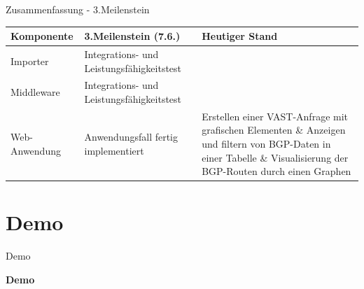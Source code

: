 \documentclass[9pt]{beamer}
\begin{document}
\begin{frame}{Zusammenfassung - 3.Meilenstein}
	\begin{table}[h!]
	\centering
	\begin{tabular}{p{5em} p{12em} p{14em}}
		\textbf{Komponente} & \textbf{3.Meilenstein (7.6.)} & \textbf{Heutiger Stand} \\ \midrule
		Importer & Integrations- und Leistungsfähigkeitstest & \\ \midrule
		Middleware &  Integrations- und Leistungsfähigkeitstest &  \\ \midrule
		Web-Anwendung &  Anwendungsfall fertig implementiert & Erstellen einer VAST-Anfrage mit grafischen Elementen \& Anzeigen und filtern von BGP-Daten in einer Tabelle \& Visualisierung der BGP-Routen durch einen Graphen \\ \bottomrule
	\end{tabular}
	\end{table}
\end{frame}

\section{Demo}

\begin{frame}{Demo}
		\begin{center}
			\LARGE \textbf{Demo}
		\end{center}

\end{frame}
\end{document}
